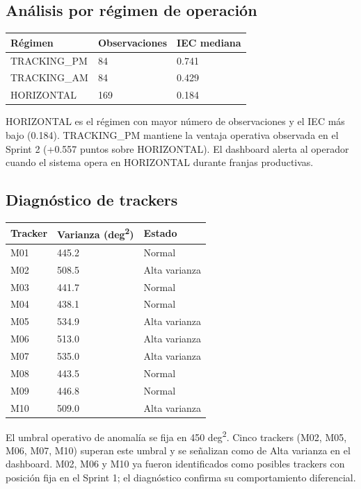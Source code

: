 \documentclass[11pt,a4paper]{article}
\begin{document}
\subsection{Análisis por régimen de operación}

\begin{longtable}{p{} p{} p{}}
\textbf{Régimen} & \textbf{Observaciones} & \textbf{IEC mediana} \\
\hline
TRACKING\_PM  & 84  & 0.741 \\
TRACKING\_AM  & 84  & 0.429 \\
HORIZONTAL    & 169 & 0.184 \\
\end{longtable}

HORIZONTAL es el régimen con mayor número de observaciones y el IEC más bajo (0.184).
TRACKING\_PM mantiene la ventaja operativa observada en el Sprint 2 (+0.557 puntos sobre
HORIZONTAL). El dashboard alerta al operador cuando el sistema opera en HORIZONTAL
durante franjas productivas.

\subsection{Diagnóstico de trackers}

\begin{longtable}{p{} p{} p{}}
\textbf{Tracker} & \textbf{Varianza (deg\textsuperscript{2})} & \textbf{Estado} \\
\hline
M01 & 445.2 & Normal \\
M02 & 508.5 & Alta varianza \\
M03 & 441.7 & Normal \\
M04 & 438.1 & Normal \\
M05 & 534.9 & Alta varianza \\
M06 & 513.0 & Alta varianza \\
M07 & 535.0 & Alta varianza \\
M08 & 443.5 & Normal \\
M09 & 446.8 & Normal \\
M10 & 509.0 & Alta varianza \\
\end{longtable}

El umbral operativo de anomalía se fija en 450 deg\textsuperscript{2}. Cinco trackers
(M02, M05, M06, M07, M10) superan este umbral y se señalizan como de Alta varianza en
el dashboard. M02, M06 y M10 ya fueron identificados como posibles trackers con posición
fija en el Sprint 1; el diagnóstico confirma su comportamiento diferencial.
\end{document}
